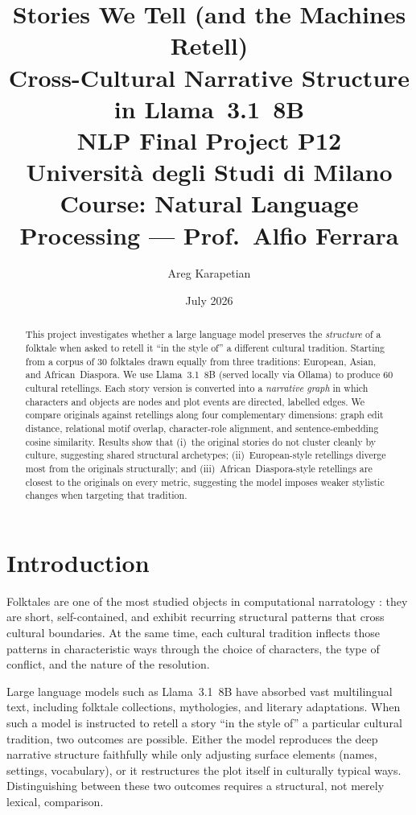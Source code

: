 \documentclass[11pt,a4paper]{article}
\title{%
  \textbf{Stories We Tell (and the Machines Retell)}\\[0.4em]
  \large Cross-Cultural Narrative Structure in Llama~3.1~8B\\[0.6em]
  \normalsize NLP Final Project P12\\
  Università degli Studi di Milano\\
  Course: Natural Language Processing --- Prof.\ Alfio Ferrara
}
\author{Areg Karapetian}
\date{July 2026}
\begin{document}
\maketitle

\begin{abstract}
This project investigates whether a large language model preserves the
\emph{structure} of a folktale when asked to retell it ``in the style of'' a
different cultural tradition.  Starting from a corpus of 30 folktales drawn
equally from three traditions: European, Asian, and African~Diaspora. We
use Llama~3.1~8B (served locally via Ollama) to produce 60 cultural
retellings.  Each story version is converted into a \emph{narrative graph}
in which characters and objects are nodes and plot events are directed, labelled
edges.  We compare originals against retellings along four complementary
dimensions: graph edit distance, relational motif overlap, character-role
alignment, and sentence-embedding cosine similarity.  Results show that (i)~the
original stories do not cluster cleanly by culture, suggesting shared structural
archetypes; (ii)~European-style retellings diverge most from the originals
structurally; and (iii)~African~Diaspora-style retellings are closest to the
originals on every metric, suggesting the model imposes weaker stylistic
changes when targeting that tradition.
\end{abstract}

\section{Introduction}

Folktales are one of the most studied objects in computational narratology
\cite{propp1928,bremond1966}: they are short, self-contained, and exhibit
recurring structural patterns that cross cultural boundaries.  At the same time,
each cultural tradition inflects those patterns in characteristic ways through
the choice of characters, the type of conflict, and the nature of the resolution.

Large language models such as Llama~3.1~8B have absorbed vast multilingual text,
including folktale collections, mythologies, and literary adaptations.  When
such a model is instructed to retell a story ``in the style of'' a particular
cultural tradition, two outcomes are possible.  Either the model reproduces the
deep narrative structure faithfully while only adjusting surface elements (names,
settings, vocabulary), or it restructures the plot itself in culturally typical
ways.  Distinguishing between these two outcomes requires a structural, not merely
lexical, comparison.
\end{document}
